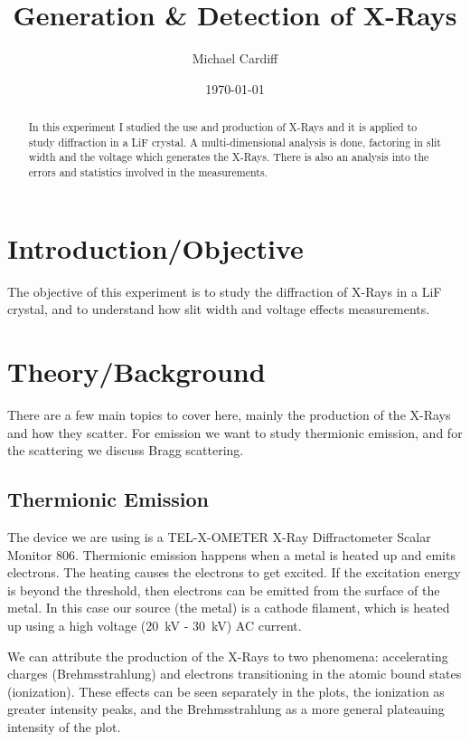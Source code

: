 \documentclass[letterpaper,12pt]{article}
\begin{document}
\title{\vspace{-3em}Generation \& Detection of X-Rays}
\author{Michael Cardiff}
\date{\today}
\maketitle

\begin{abstract}
  In this experiment I studied the use and production of X-Rays and it is applied to study diffraction in a LiF crystal. A multi-dimensional analysis is done, factoring in slit width and the voltage which generates the X-Rays. There is also an analysis into the errors and statistics involved in the measurements.   
\end{abstract}

\section{Introduction/Objective}
The objective of this experiment is to study the diffraction of X-Rays in a LiF crystal, and to understand how slit width and voltage effects measurements. 
\section{Theory/Background}
There are a few main topics to cover here, mainly the production of the X-Rays and how they scatter. For emission we want to study thermionic emission, and for the scattering we discuss Bragg scattering.
\subsection{Thermionic Emission}
The device we are using is a TEL-X-OMETER X-Ray Diffractometer Scalar Monitor 806. Thermionic emission happens when a metal is heated up and emits electrons. The heating causes the electrons to get excited. If the excitation energy is beyond the threshold, then electrons can be emitted from the surface of the metal. In this case our source (the metal) is a cathode filament, which is heated up using a high voltage (\SI{20}{\kV} - \SI{30}{\kV}) AC current.

We can attribute the production of the X-Rays to two phenomena: accelerating charges (Brehmsstrahlung) and electrons transitioning in the atomic bound states (ionization). These effects can be seen separately in the plots, the ionization as greater intensity peaks, and the Brehmsstrahlung as a more general plateauing intensity of the plot.
\end{document}
